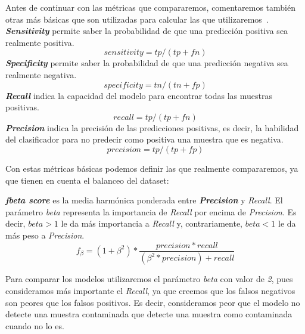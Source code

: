 Antes de continuar con las métricas que compararemos, comentaremos también otras más básicas que son utilizadas para calcular las que utilizaremos\ \cite{Precisio23:online}.
\\ \textit{\textbf{Sensitivity}} permite saber la probabilidad de que una predicción positiva sea realmente positiva.
    \begin{equation}
        sensitivity=tp/(tp+fn)
    \end{equation}
\textit{\textbf{Specificity}} permite saber la probabilidad de que una predicción negativa sea realmente negativa.
\begin{equation}
        specificity=tn/(tn+fp)
    \end{equation}
\textit{\textbf{Recall}} indica la capacidad del modelo para encontrar todas las muestras positivas. 
    \begin{equation}
        recall=tp/(tp+fn)
    \end{equation}
\textit{\textbf{Precision}} indica la precisión de las predicciones positivas, es decir, la habilidad del clasificador para no predecir como positiva una muestra que es negativa.
    \begin{equation}
        precision=tp/(tp+fp)
    \end{equation}

Con estas métricas básicas podemos definir las que realmente compararemos, ya que tienen en cuenta el balanceo del \gls{dataset}:

\textit{\textbf{fbeta score}} es la media harmónica ponderada entre \textit{\textbf{Precision}} y \textit{Recall}. 
El parámetro \textit{beta} representa la importancia de \textit{Recall} por encima de \textit{Precision}. 
Es decir, \(beta>1\) le da más importancia a \textit{Recall} y, contrariamente, \(beta<1\) le da más peso a \textit{Precision}.\ \cite{FscoreWi30:online}
    \begin{equation}
        f_\beta = (1 + \beta^2)*\frac{precision*recall}{(\beta^2*precision)+recall}
    \end{equation}

Para comparar los modelos utilizaremos el parámetro \textit{beta} con valor de \textit{2}, pues consideramos más importante el \textit{Recall}, ya que creemos que los falsos negativos son peores que los falsos positivos. Es decir, consideramos peor que el modelo no detecte una muestra contaminada que detecte una muestra como contaminada cuando no lo es.

